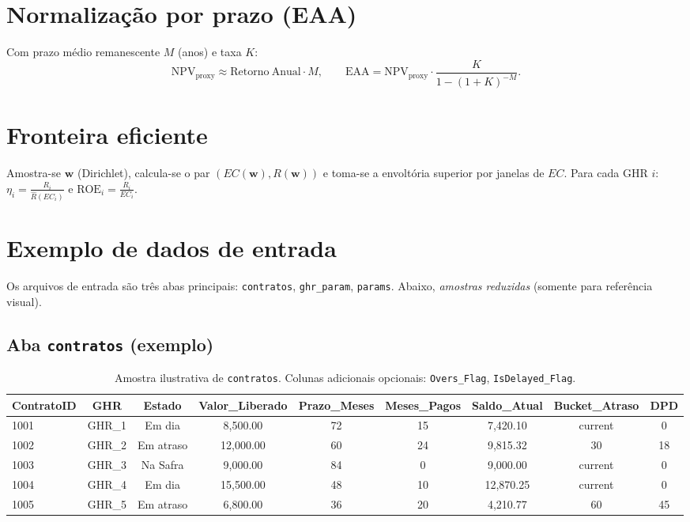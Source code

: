 \documentclass[11pt,a4paper]{article}
\newcommand{\1}{\mathbf{1}}
\newcommand{\vect}[1]{\bm{#1}}
\begin{document}
\section{Normalização por prazo (EAA)}
Com prazo médio remanescente $M$ (anos) e taxa $K$:
\[
\mathrm{NPV}_{\text{proxy}}\approx \mathrm{Retorno\ Anual}\cdot M,\qquad
\mathrm{EAA}=\mathrm{NPV}_{\text{proxy}}\cdot \frac{K}{1-(1+K)^{-M}}.
\]

\section{Fronteira eficiente}
Amostra-se $\vect{w}$ (Dirichlet), calcula-se o par $(EC(\vect{w}),R(\vect{w}))$ e toma-se a envoltória superior por janelas de $EC$. Para cada GHR $i$: $\eta_i=\frac{R_i}{\widehat{R}(EC_i)}$ e $\mathrm{ROE}_i=\frac{R_i}{EC_i}$.

\section{Exemplo de dados de entrada}
\label{sec:exemplo-entrada}
Os arquivos de entrada são três abas principais: \texttt{contratos}, \texttt{ghr\_param}, \texttt{params}. Abaixo, \emph{amostras reduzidas} (somente para referência visual).

\subsection*{Aba \texttt{contratos} (exemplo)}
\begin{table}[H]\centering
\small
\begin{tabular}{lcccccccc}
\toprule
ContratoID & GHR & Estado & Valor\_Liberado & Prazo\_Meses & Meses\_Pagos & Saldo\_Atual & Bucket\_Atraso & DPD \\
\midrule
1001 & GHR\_1 & Em dia   & 8{,}500.00 & 72 & 15 & 7{,}420.10 & current & 0 \\
1002 & GHR\_2 & Em atraso& 12{,}000.00 & 60 & 24 & 9{,}815.32 & 30      & 18 \\
1003 & GHR\_3 & Na Safra & 9{,}000.00 & 84 & 0  & 9{,}000.00 & current & 0 \\
1004 & GHR\_4 & Em dia   & 15{,}500.00 & 48 & 10 & 12{,}870.25& current & 0 \\
1005 & GHR\_5 & Em atraso& 6{,}800.00  & 36 & 20 & 4{,}210.77 & 60      & 45 \\
\bottomrule
\end{tabular}
\caption{Amostra ilustrativa de \texttt{contratos}. Colunas adicionais opcionais: \texttt{Overs\_Flag}, \texttt{IsDelayed\_Flag}.}
\end{table}
\end{document}
